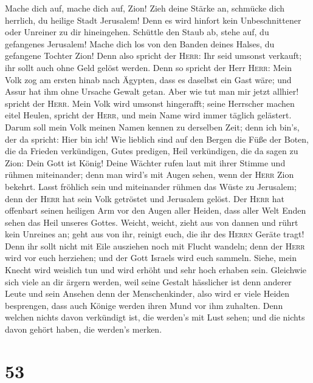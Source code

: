  Mache dich auf, mache dich auf, Zion! Zieh deine Stärke
an, schmücke dich herrlich, du heilige Stadt Jerusalem! Denn es wird
hinfort kein Unbeschnittener oder Unreiner zu dir hineingehen.
 Schüttle den Staub ab, stehe auf, du gefangenes
Jerusalem! Mache dich los von den Banden deines Halses, du gefangene
Tochter Zion!  Denn also spricht der \textsc{Herr}: Ihr
seid umsonst verkauft; ihr sollt auch ohne Geld gelöst werden.
 Denn so spricht der Herr \textsc{Herr}: Mein Volk zog am
ersten hinab nach Ägypten, dass es daselbst ein Gast wäre; und Assur hat
ihm ohne Ursache Gewalt getan.  Aber wie tut man mir jetzt
allhier! spricht der \textsc{Herr}. Mein Volk wird umsonst hingerafft;
seine Herrscher machen eitel Heulen, spricht der \textsc{Herr}, und mein
Name wird immer täglich gelästert.  Darum soll mein Volk
meinen Namen kennen zu derselben Zeit; denn ich bin's, der da spricht:
Hier bin ich!  Wie lieblich sind auf den Bergen die Füße
der Boten, die da Frieden verkündigen, Gutes predigen, Heil verkündigen,
die da sagen zu Zion: Dein Gott ist König!  Deine Wächter
rufen laut mit ihrer Stimme und rühmen miteinander; denn man wird's mit
Augen sehen, wenn der \textsc{Herr} Zion bekehrt.  Lasst
fröhlich sein und miteinander rühmen das Wüste zu Jerusalem; denn der
\textsc{Herr} hat sein Volk getröstet und Jerusalem gelöst.
 Der \textsc{Herr} hat offenbart seinen heiligen Arm vor
den Augen aller Heiden, dass aller Welt Enden sehen das Heil unseres
Gottes.  Weicht, weicht, zieht aus von dannen und rührt
kein Unreines an; geht aus von ihr, reinigt euch, die ihr des
\textsc{Herrn} Geräte tragt!  Denn ihr sollt nicht mit
Eile ausziehen noch mit Flucht wandeln; denn der \textsc{Herr} wird vor
euch herziehen; und der Gott Israels wird euch sammeln. 
Siehe, mein Knecht wird weislich tun und wird erhöht und sehr hoch
erhaben sein.  Gleichwie sich viele an dir ärgern werden,
weil seine Gestalt hässlicher ist denn anderer Leute und sein Ansehen
denn der Menschenkinder,  also wird er viele Heiden
besprengen, dass auch Könige werden ihren Mund vor ihm zuhalten. Denn
welchen nichts davon verkündigt ist, die werden's mit Lust sehen; und
die nichts davon gehört haben, die werden's merken.

\hypertarget{section-52}{%
\section{53}\label{section-52}}

